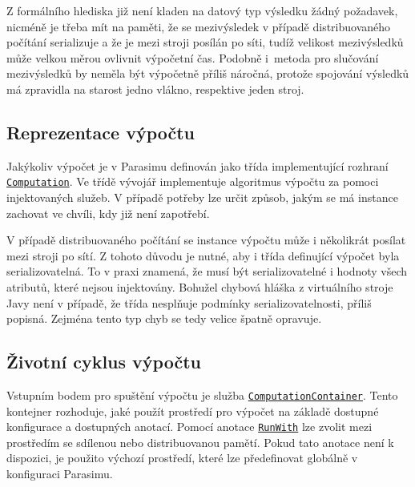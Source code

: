 Z formálního hlediska již není kladen na datový typ výsledku žádný požadavek, nicméně
je třeba mít na paměti, že se mezivýsledek v případě distribuovaného počítání
serializuje a že je mezi stroji posílán po síti, tudíž velikost mezivýsledků může velkou měrou
ovlivnit výpočetní čas. Podobně i~me\-to\-da pro slučování mezivýsledků by neměla být vý\-po\-čet\-ně
příliš ná\-roč\-ná, protože spojování výsledků má zpravidla na starost jedno vlákno, respektive
jeden stroj.

\subsection{Reprezentace výpočtu}

Jakýkoliv výpočet je v Parasimu definován jako třída implementující rozhraní \href{https://github.com/sybila/parasim/blob/2.0.0.Final/extensions/computation-lifecycle-api/src/main/java/org/sybila/parasim/computation/lifecycle/api/Computation.java}{\texttt{Computation}}. Ve třídě vývojář
implementuje algoritmus výpočtu za pomoci injektovaných služeb. V případě potřeby
lze určit způsob, jakým se má instance zachovat ve chvíli, kdy již není zapotřebí.

V případě distribuovaného počítání se instance výpočtu může i ně\-ko\-lik\-rát posílat mezi stroji po sítí. Z tohoto důvodu
je nutné, aby i třída definující výpočet byla serializovatelná. To v praxi znamená, že musí
být serializovatelné i hodnoty všech atributů, které nejsou injektovány. Bohužel chybová hláška z virtuálního stroje Javy
není v případě, že třída nesplňuje podmínky serializovatelnosti, příliš popisná.
Zejména tento typ chyb se tedy velice špatně opravuje.

\subsection{Životní cyklus výpočtu}

Vstupním bodem pro spuštění výpočtu je služba \href{https://github.com/sybila/parasim/blob/2.0.0.Final/extensions/computation-lifecycle-api/src/main/java/org/sybila/parasim/computation/lifecycle/api/ComputationContainer.java}{\texttt{ComputationContainer}}. Tento kontejner rozhoduje,
jaké použít prostředí pro výpočet na základě dostupné konfigurace a dostupných anotací.
Pomocí anotace \href{https://github.com/sybila/parasim/blob/2.0.0.Final/extensions/computation-lifecycle-api/src/main/java/org/sybila/parasim/computation/lifecycle/api/annotations/RunWith.java}{\texttt{RunWith}} lze zvolit mezi prostředím se sdílenou nebo distribuovanou pamětí. Pokud tato anotace
není k dispozici, je použito výchozí prostředí, které lze předefinovat globálně v konfiguraci
Parasimu.

